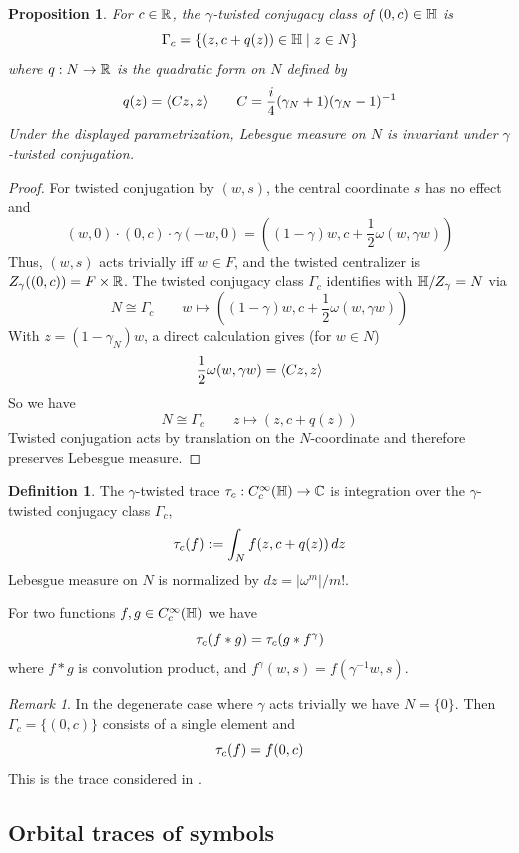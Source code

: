 \documentclass[11pt]{amsart}
\theoremstyle{plain}
\newtheorem{proposition}[theorem]{Proposition}
\theoremstyle{definition}
\newtheorem{definition}[theorem]{Definition}
\theoremstyle{remark}
\newtheorem{remark}[theorem]{Remark}
\begin{document}
\begin{proposition}
For $c\in {\mathbb{R}}$, the $\gamma$-twisted conjugacy class of $(0,c)\in \mathbb{H}$ is
\[ \Gamma_{c} = \{(z,c+q(z))\in\mathbb{H} \mid z\in N\}\]
where $q:N\to {\mathbb{R}}$ is the quadratic form on $N$ defined by
\[q(z)=\langle Cz,z \rangle \qquad C=\frac{i}{4}(\gamma_N+1)(\gamma_N-1)^{-1}\]
Under the displayed parametrization, Lebesgue measure on $N$ is invariant under $\gamma$-twisted conjugation.
\end{proposition}
\begin{proof}
For twisted conjugation by $(w,s)$, the central coordinate $s$ has no effect and
\begin{equation*}
(w,0)\cdot (0,c)\cdot\gamma (-w,0)
    = ((1-\gamma) w, c+\frac{1}{2}\omega(w,\gamma w))
\end{equation*}
Thus, $(w,s)$ acts trivially iff $w\in F$, and the twisted centralizer is
$Z_\gamma((0,c))=F\times {\mathbb{R}}$.
The twisted conjugacy class $\Gamma_c$ identifies with $\mathbb{H}/Z_\gamma = N$ via
\[ N\cong \Gamma_c \qquad w\mapsto ((1-\gamma)w, c+\frac{1}{2}\omega(w,\gamma w))\]
With $z=(1-\gamma_N)w$, a direct calculation gives (for $w\in N$)
\[
\frac{1}{2}\omega(w,\gamma w)=\langle Cz,z \rangle
\]
So we have
\[ N\cong \Gamma_c \qquad z\mapsto (z, c+q(z))\]
Twisted conjugation acts by translation on the $N$-coordinate and therefore preserves Lebesgue measure.
\end{proof}

\begin{definition}
The $\gamma$-twisted trace $\tau_{c}:C_c^\infty(\mathbb{H})\to {\mathbb{C}}$ is integration over the $\gamma$-twisted conjugacy class $\Gamma_c$,
\[\tau_{c}(f) := \int_N f(z,c+q(z))\,dz\]
Lebesgue measure on $N$ is normalized by $dz=|\omega^m|/m!$.
\end{definition}
For two functions $f,g\in C_c^\infty(\mathbb{H})$ we have
\[ \tau_{c}(f\ast g) = \tau_{c}(g\ast f^\gamma)\]
where $f\ast g$ is convolution product, and $f^\gamma(w,s)=f(\gamma^{-1}w,s)$.

\begin{remark}
In the degenerate case where $\gamma$ acts trivially we have $N=\{0\}$. Then $\Gamma_c=\{(0,c)\}$ consists of a single element and
\[ \tau_{c}(f)=f(0,c)\]
This is the trace considered in \cite{GvE25}.
\end{remark}

\subsection{Orbital traces of symbols}
\end{document}
